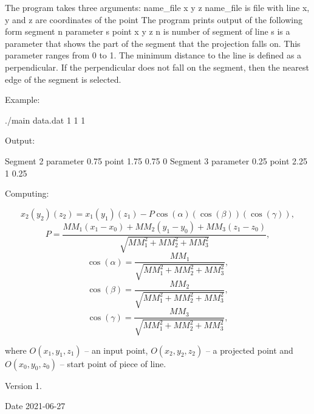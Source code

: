 The program takes three arguments\+: name\+\_\+file x y z name\+\_\+file is file with line x, y and z are coordinates of the point The program prints output of the following form segment n parameter s point x y z n is number of segment of line s is a parameter that shows the part of the segment that the projection falls on. This parameter ranges from 0 to 1. The minimum distance to the line is defined as a perpendicular. If the perpendicular does not fall on the segment, then the nearest edge of the segment is selected.

Example\+: \begin{DoxyVerb}./main data.dat 1 1 1 
\end{DoxyVerb}
 Output\+: \begin{DoxyVerb}Segment 2 parameter 0.75 point 1.75 0.75 0
Segment 3 parameter 0.25 point 2.25 1 0.25
\end{DoxyVerb}
 Computing\+:

\[ x_2 (y_2) (z_2) = x_1 (y_1) (z_1) - P \cos(\alpha) (\cos(\beta)) (\cos(\gamma)), \] \[ P = \frac{MM_1(x_1 - x_0) + MM_2(y_1 - y_0) + MM_3(z_1 - z_0)}{\sqrt{MM_1^2 + MM_2^2 + MM_3^2}}, \] \[ \cos(\alpha) = \frac{MM_1}{\sqrt{MM_1^2 + MM_2^2 + MM_3^2}}, \] \[ \cos(\beta) = \frac{MM_2}{\sqrt{MM_1^2 + MM_2^2 + MM_3^2}}, \] \[ \cos(\gamma) = \frac{MM_3}{\sqrt{MM_1^2 + MM_2^2 + MM_3^2}}, \]

where $O(x_1, y_1, z_1)$ -- an input point, $O(x_2, y_2, z_2)$ -- a projected point and $ O(x_0, y_0, z_0)$ -- start point of piece of line.

\begin{DoxyVersion}{Version}
1. 
\end{DoxyVersion}
\begin{DoxyDate}{Date}
2021-\/06-\/27 
\end{DoxyDate}
